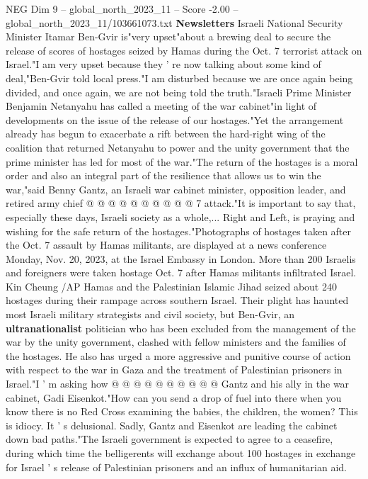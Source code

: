 \begin{textsample}{NEG Dim 9 – global\_north\_2023\_11 – Score -2.00 – global\_north\_2023\_11/103661073.txt}  \label{ex:f9_neg_305}
\textbf{Newsletters} Israeli National Security Minister Itamar Ben-Gvir is"very upset"about a brewing deal to secure the release of scores of hostages seized by Hamas during the Oct. 7 terrorist attack on Israel."I am very upset because they ' re now talking about some kind of deal,"Ben-Gvir told local press."I am disturbed because we are once again being divided, and once again, we are not being told the truth."Israeli Prime Minister Benjamin Netanyahu has called a meeting of the war cabinet"in light of developments on the issue of the release of our hostages."Yet the arrangement already has begun to exacerbate a rift between the hard-right wing of the coalition that returned Netanyahu to power and the unity government that the prime minister has led for most of the war."The return of the hostages is a moral order and also an integral part of the resilience that allows us to win the war,"said Benny Gantz, an Israeli war cabinet minister, opposition leader, and retired army chief @ @ @ @ @ @ @ @ @ @ 7 attack."It is important to say that, especially these days, Israeli society as a whole,...
Right and Left, is praying and wishing for the safe return of the hostages."Photographs of hostages taken after the Oct. 7 assault by Hamas militants, are displayed at a news conference Monday, Nov. 20, 2023, at the Israel Embassy in London.
More than 200 Israelis and foreigners were taken hostage Oct. 7 after Hamas militants infiltrated Israel.
Kin Cheung /AP Hamas and the Palestinian Islamic Jihad seized about 240 hostages during their rampage across southern Israel.
Their plight has haunted most Israeli military strategists and civil society, but Ben-Gvir, an \textbf{ultranationalist} politician who has been excluded from the management of the war by the unity government, clashed with fellow ministers and the families of the hostages.
He also has urged a more aggressive and punitive course of action with respect to the war in Gaza and the treatment of Palestinian prisoners in Israel."I ' m asking how @ @ @ @ @ @ @ @ @ @ Gantz and his ally in the war cabinet, Gadi Eisenkot."How can you send a drop of fuel into there when you know there is no Red Cross examining the babies, the children, the women?
This is idiocy.
It ' s delusional.
Sadly, Gantz and Eisenkot are leading the cabinet down bad paths."The Israeli government is expected to agree to a ceasefire, during which time the belligerents will exchange about 100 hostages in exchange for Israel ' s release of Palestinian prisoners and an influx of humanitarian aid.

\end{textsample}
